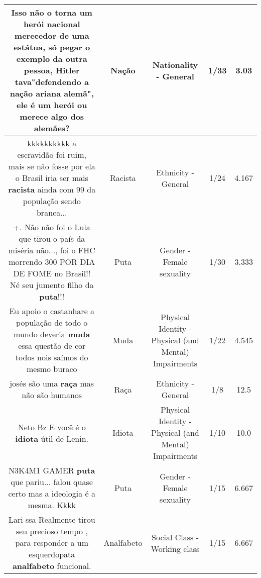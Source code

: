 \documentclass[11pt]{article}
\newlength\mylength
\begin{document}
\begin{center}
\begin{longtable}{|C{.65\mylength}|C{.30\mylength}|C{.12\mylength}|C{.12\mylength}|C{.12\mylength}|}
  \small Isso não o torna um herói nacional merecedor de uma estátua, só pegar o exemplo da outra pessoa, Hitler tava"defendendo a \textbf{nação} ariana alemã", ele é um herói ou merece algo dos alemães?\normalsize   & Nação & Nationality - General & 1/33 & 3.03 \\  \hline
  \small kkkkkkkkkk a escravidão foi ruim, mais se não fosse por ela o Brasil iria ser mais \textbf{racista} ainda com 99 da população sendo branca...\normalsize   & Racista & Ethnicity - General & 1/24 & 4.167 \\  \hline
  \small +. Não não foi o Lula que tirou o país da miséria não..., foi o FHC morrendo 300 POR DIA DE FOME no Brasil!! Né seu jumento filho da \textbf{puta}!!!\normalsize   & Puta & Gender - Female sexuality & 1/30 & 3.333 \\  \hline
  \small Eu apoio o castanhare a população de todo o mundo deveria \textbf{muda} essa questão de cor todos nois saímos do mesmo buraco\normalsize   & Muda & Physical Identity - Physical (and Mental) Impairments & 1/22 & 4.545 \\  \hline
  \small josés são uma \textbf{raça} mas não são humanos\normalsize   & Raça & Ethnicity - General & 1/8 & 12.5 \\  \hline
  \small Neto Bz E você é o \textbf{idiota} útil de Lenin.\normalsize   & Idiota & Physical Identity - Physical (and Mental) Impairments & 1/10 & 10.0 \\  \hline
  \small N3K4M1 GAMER \textbf{puta} que pariu... falou quase certo mas a ideologia é a mesma. Kkkk\normalsize   & Puta & Gender - Female sexuality & 1/15 & 6.667 \\  \hline
  \small Lari ssa Realmente tirou seu precioso tempo , para responder a um esquerdopata \textbf{analfabeto} funcional.\normalsize   & Analfabeto & Social Class - Working class & 1/15 & 6.667 \\  \hline

\end{longtable}
\end{center}
\end{document}
